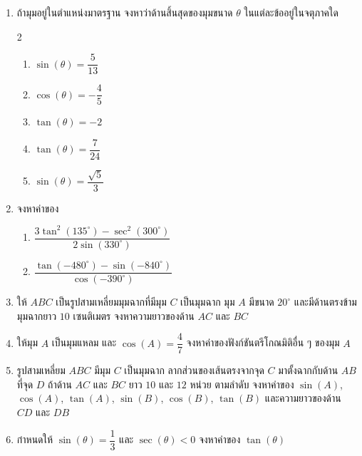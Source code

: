 \begin{enumerate}[label=\arabic*., leftmargin=*, itemsep=1em]
	\item ถ้ามุมอยู่ในตำแหน่งมาตรฐาน จงหาว่าด้านสิ้นสุดของมุมขนาด $\theta$ ในแต่ละข้ออยู่ในจตุภาคใด
	\begin{multicols}{2}
		\begin{enumerate}[label=\theenumi\arabic*), leftmargin=1.5em, itemsep=0.6em]
			\everymath{\displaystyle}
			\item $\sin \left( \theta \right) = \dfrac{5}{13}$
			\item $\cos \left( \theta \right) = -\dfrac{4}{5}$
			\item $\tan \left( \theta \right) = -2$
			\item $\tan \left( \theta \right) = \dfrac{7}{24}$
			\item $\sin \left( \theta \right) = \dfrac{\sqrt{5}}{3}$
		\end{enumerate}
	\end{multicols}
	
	\item จงหาค่าของ
	\begin{enumerate}[label=\theenumi\arabic*), leftmargin=1.5em, itemsep=0.6em]
		\everymath{\displaystyle}
		\item $\dfrac{3 \tan^{2} \left( 135^{\circ} \right) - \sec^{2} \left( 300^{\circ} \right)}{2 \sin \left( 330^{\circ} \right)}$
		\item $\dfrac{\tan \left( -480^{\circ} \right) - \sin \left( -840^{\circ} \right)}{\cos \left( -390^{\circ} \right)}$
	\end{enumerate}
	
	\item ให้ $ABC$ เป็นรูปสามเหลี่ยมมุมฉากที่มีมุม $C$ เป็นมุมฉาก มุม $A$ มีขนาด $20^{\circ}$ และมีด้านตรงข้ามมุมฉากยาว $10$ เซนติเมตร จงหาความยาวของด้าน $AC$ และ $BC$
	
	\item ให้มุม $A$ เป็นมุมแหลม และ $\cos \left( A \right) = \dfrac{4}{7}$ จงหาค่าของฟังก์ชันตรีโกณมิติอื่น ๆ ของมุม $A$
	
	\item รูปสามเหลี่ยม $ABC$ มีมุม $C$ เป็นมุมฉาก ลากส่วนของเส้นตรงจากจุด $C$ มาตั้งฉากกับด้าน $AB$ ที่จุด $D$ ถ้าด้าน $AC$ และ $BC$ ยาว $10$ และ $12$ หน่วย ตามลำดับ จงหาค่าของ $\sin \left( A \right)$, $\cos \left( A \right)$, $\tan \left( A \right)$, $\sin \left( B \right)$, $\cos \left( B \right)$, $\tan \left( B \right)$ และความยาวของด้าน $CD$ และ $DB$
	
	\item กำหนดให้ $\sin \left( \theta \right) = \dfrac{1}{3}$ และ $\sec \left( \theta \right) < 0$ จงหาค่าของ $\tan \left( \theta \right)$
	

\end{enumerate}
